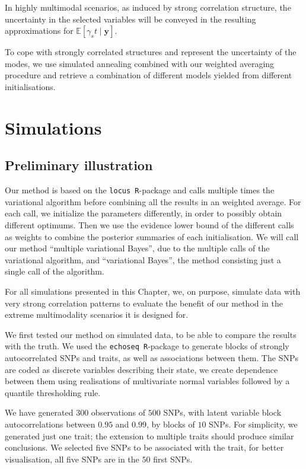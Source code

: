\documentclass[a4paper, 11pt]{report}
\numberwithin{equation}{chapter}
\begin{document}
In highly multimodal scenarios, as induced by strong correlation structure, the uncertainty in the selected variables will be conveyed in the resulting approximations for $\mathbb{E}\left[\gamma_st\mid \boldsymbol{y}\right]$.

To cope with strongly correlated structures and represent the uncertainty of the modes, we use simulated annealing combined with our weighted averaging procedure and retrieve a combination of different models yielded from different initialisations.

\newpage
\chapter{Simulations}
\section{Preliminary illustration}
Our method is based on the \texttt{locus R}-package \citep{r_locus} and calls multiple times the variational algorithm before combining all the results in an weighted average. For each call, we initialize the parameters differently, in order to possibly obtain different optimums. Then we use the evidence lower bound of the different calls as weights to combine the posterior summaries of each initialisation. We will call our method ``multiple variational Bayes'', due to the multiple calls of the variational algorithm, and ``variational Bayes'', the method consisting just a single call of the algorithm.

For all simulations presented in this Chapter, we, on purpose, simulate data with very strong correlation patterns to evaluate the benefit of our method in the extreme multimodality scenarios it is designed for.

We first tested our method on simulated data, to be able to compare the results with the truth. We used the \texttt{echoseq R}-package \citep{r_echoseq} to generate blocks of strongly autocorrelated SNPs and traits, as well as associations between them. The SNPs are coded as discrete variables describing their state, we create dependence between them using realisations of multivariate normal variables followed by a quantile thresholding rule.

We have generated $300$ observations of $500$ SNPs, with latent variable block autocorrelations between $0.95$ and $0.99$, by blocks of $10$ SNPs. For simplicity, we generated just one trait; the extension to multiple traits should produce similar conclusions. We selected five SNPs to be associated with the trait, for better visualisation, all five SNPs are in the $50$ first SNPs.
\end{document}
